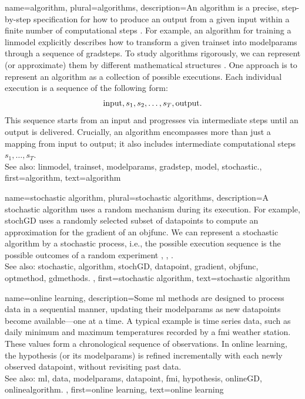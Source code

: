 {name={algorithm}, plural={algorithms},
 	description={An algorithm is a precise, step-by-step specification for 
  		how to produce an output from a given input within a finite number of computational steps \cite{Cormen:2022aa}. 
    		For example, an algorithm for training a \gls{linmodel} explicitly describes how to 
		transform a given \gls{trainset} into \gls{modelparams} through a sequence of \glspl{gradstep}. 
    		To study algorithms rigorously, we can represent (or approximate) them by different mathematical structures \cite{Sipser2013}. 
     		One approach is to represent an algorithm as a collection of possible executions. Each individual 
     		execution is a sequence of the following form: $${\rm input}, s_1, s_2, \ldots, s_T, {\rm output}.$$ This sequence 
     		starts from an input and progresses via intermediate steps until an output is delivered. Crucially, an algorithm 
     		encompasses more than just a mapping from input to output; it also includes intermediate computational 
     		steps $s_1, \ldots, s_T$.
				\\ 
		See also: \gls{linmodel}, \gls{trainset}, \gls{modelparams}, \gls{gradstep}, \gls{model}, \gls{stochastic}.},
	first={algorithm},
	text={algorithm} 
}

{name={stochastic algorithm}, 
 plural={stochastic algorithms},
	description={A \gls{stochastic} \gls{algorithm} uses a random mechanism 
		during its execution. For example, \gls{stochGD} uses a randomly selected subset of \glspl{datapoint} 
		to compute an approximation for the \gls{gradient} of an \gls{objfunc}. We can represent a 
		\gls{stochastic} \gls{algorithm} by a \gls{stochastic} process, i.e., the possible execution sequence is the possible outcomes of 
		a random experiment \cite{BertsekasProb}, \cite{RandomizedAlgos}, \cite{Gallager13}.		
		\\ 
		See also: \gls{stochastic}, \gls{algorithm}, \gls{stochGD}, \gls{datapoint}, \gls{gradient}, \gls{objfunc}, \gls{optmethod}, \gls{gdmethods}. },
	first={stochastic algorithm},
	text={stochastic algorithm} 
}

{name={online learning},
	description={Some \gls{ml} methods  are designed to process \gls{data} in a sequential 
		manner, updating their \gls{modelparams} as new \glspl{datapoint} become available—one at a time. 
		A typical example is time series data, such as daily \gls{minimum} and \gls{maximum} temperatures 
		recorded by a \gls{fmi} weather station. These values form a chronological sequence 
		of observations. In online learning, the \gls{hypothesis} (or its \gls{modelparams}) is refined 
		incrementally with each newly observed \gls{datapoint}, without revisiting past \gls{data}.  
		\\ 
		See also: \gls{ml}, \gls{data}, \gls{modelparams}, \gls{datapoint}, \gls{fmi}, \gls{hypothesis}, \gls{onlineGD}, \gls{onlinealgorithm}. },
	first={online learning},
	text={online learning} 
}

